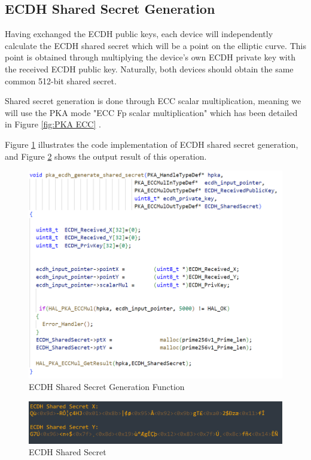     \subsection{ECDH Shared Secret Generation}
    Having exchanged the ECDH public keys, each device will independently calculate the ECDH shared secret which will be a point on the elliptic curve. This point is obtained through multiplying the device's own ECDH private key with the received ECDH public key. Naturally, both devices should obtain the same common 512-bit shared secret.

    Shared secret generation is done through ECC scalar multiplication, meaning we will use the PKA mode "ECC Fp scalar multiplication" which has been detailed in Figure \ref{fig:PKA ECC} \cite{U5_Refman}.

    Figure \ref{fig:shared sec} illustrates the code implementation of ECDH shared secret generation, and Figure \ref{fig:shared sec out} shows the output result of this operation.
    \begin{figure}[H]
    \centering
    \includegraphics[width=17cm]{img/shared sec.png}
    \caption{ECDH Shared Secret Generation Function}
    \label{fig:shared sec}
    \end{figure}

    
    \begin{figure}[H]
    \centering
    \includegraphics[width=17cm]{img/shared sec out.png}
        \caption{ECDH Shared Secret}
    \label{fig:shared sec out}
    \end{figure}
